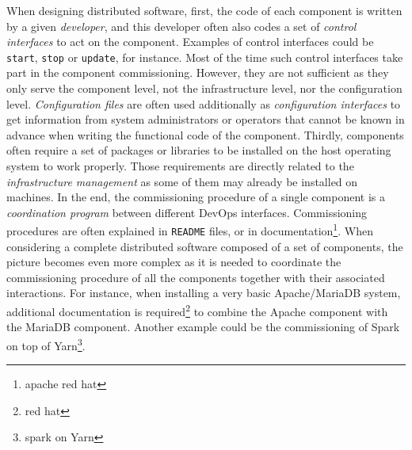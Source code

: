 When designing distributed software, first, the code of each component
is written by a given \emph{developer}, and this developer often also
codes a set of \emph{control interfaces} to act on the
component. Examples of control interfaces could be \texttt{start},
\texttt{stop} or \texttt{update}, for instance. Most of the time such
control interfaces take part in the component commissioning. However,
they are not sufficient as they only serve the component level, not
the infrastructure level, nor the configuration
level. \emph{Configuration files} are often used additionally as
\emph{configuration interfaces} to get information from system
administrators or operators that cannot be known in advance when
writing the functional code of the component. Thirdly, components
often require a set of packages or libraries to be installed on the
host operating system to work properly. Those requirements are
directly related to the \emph{infrastructure management} as some of
them may already be installed on machines.
In the end, the commissioning procedure of a single component is a
\emph{coordination program} between different DevOps
interfaces. Commissioning procedures are often explained in
\texttt{README} files, or in documentation\footnote{apache red hat}.
%
%
When considering a complete distributed software composed of a set of
components, the picture becomes even more complex as it is needed to
coordinate the commissioning procedure of all the components together
with their associated interactions. For instance, when installing a
very basic Apache/MariaDB system, additional documentation is
required\footnote{red hat} to combine the Apache component with the
MariaDB component. Another example could be the commissioning of Spark
on top of Yarn\footnote{spark on Yarn}.


